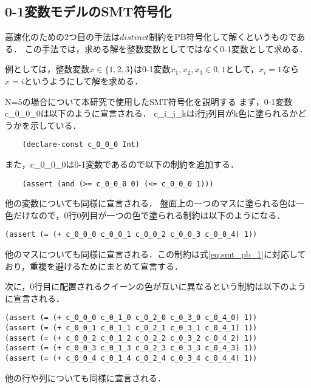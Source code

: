 


\subsection{0-1変数モデルのSMT符号化}\label{sec:pro_pb}

高速化のための2つ目の手法は$distinct$制約をPB符号化して解くというものである．
この手法では，求める解を整数変数としてではなく0-1変数として求める．

例としては，整数変数$x \in \{1,2,3\}$は0-1変数$x_1,x_2,x_3 \in {0,1}$として，$x_i=1$なら$x=i$というようにして解を求める．

N=5の場合について本研究で使用したSMT符号化を説明する
まず，0-1変数c\_0\_0\_0は以下のように宣言される．
c\_i\_j\_kはi行j列目がk色に塗られるかどうかを示している．
\begin{verbatim}
    (declare-const c_0_0_0 Int)
\end{verbatim}
また，c\_0\_0\_0は0-1変数であるので以下の制約を追加する．
\begin{verbatim}
    (assert (and (>= c_0_0_0 0) (<= c_0_0_0 1)))
\end{verbatim}
他の変数についても同様に宣言される．
盤面上の一つのマスに塗られる色は一色だけなので，0行0列目が一つの色で塗られる制約は以下のようになる．
\begin{verbatim}
(assert (= (+ c_0_0_0 c_0_0_1 c_0_0_2 c_0_0_3 c_0_0_4) 1))
\end{verbatim}
他のマスについても同様に宣言される．この制約は式\ref{eq:smt_pb_1}に対応しており，重複を避けるためにまとめて宣言する．

次に，0行目に配置されるクイーンの色が互いに異なるという制約は以下のように宣言される．
\begin{verbatim}
(assert (= (+ c_0_0_0 c_0_1_0 c_0_2_0 c_0_3_0 c_0_4_0) 1))
(assert (= (+ c_0_0_1 c_0_1_1 c_0_2_1 c_0_3_1 c_0_4_1) 1))
(assert (= (+ c_0_0_2 c_0_1_2 c_0_2_2 c_0_3_2 c_0_4_2) 1))
(assert (= (+ c_0_0_3 c_0_1_3 c_0_2_3 c_0_3_3 c_0_4_3) 1))
(assert (= (+ c_0_0_4 c_0_1_4 c_0_2_4 c_0_3_4 c_0_4_4) 1))
\end{verbatim}
他の行や列についても同様に宣言される．

